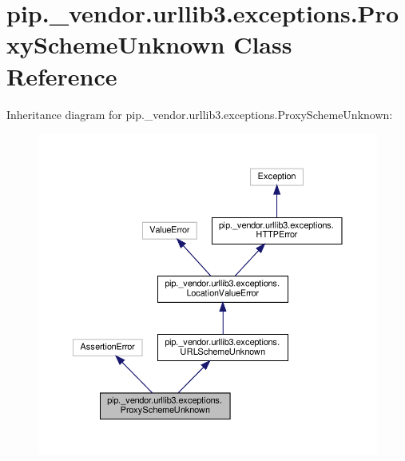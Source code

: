 \hypertarget{classpip_1_1__vendor_1_1urllib3_1_1exceptions_1_1ProxySchemeUnknown}{}\section{pip.\+\_\+vendor.\+urllib3.\+exceptions.\+Proxy\+Scheme\+Unknown Class Reference}
\label{classpip_1_1__vendor_1_1urllib3_1_1exceptions_1_1ProxySchemeUnknown}


Inheritance diagram for pip.\+\_\+vendor.\+urllib3.\+exceptions.\+Proxy\+Scheme\+Unknown\+:
\nopagebreak
\begin{figure}[H]
\begin{center}
\leavevmode
\includegraphics[width=350pt]{classpip_1_1__vendor_1_1urllib3_1_1exceptions_1_1ProxySchemeUnknown__inherit__graph}
\end{center}
\end{figure}


